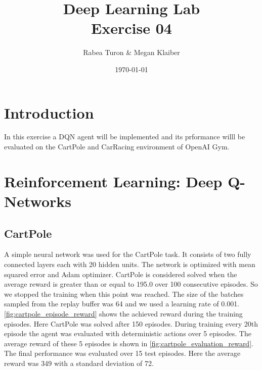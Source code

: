 \documentclass[a4paper,12pt]{article}
\begin{document}
\title{Deep Learning Lab \\ Exercise 04 }
\author{Rabea Turon \& Megan Klaiber}
\date{\today}
\maketitle

\section{Introduction}

In this exercise a DQN agent will be implemented and its prformance willl be evaluated on the CartPole and CarRacing environment of OpenAI Gym.


\section{Reinforcement Learning: Deep Q-Networks}\label{rl}


\subsection{CartPole}\label{cartpole}

A simple neural network was used for the CartPole task. It consists of two fully connected layers each with 20 hidden units. The network is optimized with mean squared error and Adam optimizer. CartPole is considered solved when the average reward is greater than or equal to 195.0 over 100 consecutive episodes. So we stopped the training when this point was reached. The size of the batches sampled from the replay buffer was 64 and we used a learning rate of 0.001.\\

\autoref{fig:cartpole_episode_reward} shows the achieved reward during the training episodes. Here CartPole was solved after 150 episodes. During training every 20th episode the agent was evaluated with deterministic actions over 5 episodes. The average reward of these 5 episodes is shown in \autoref{fig:cartpole_evaluation_reward}. The final performance was evaluated over 15 test episodes. Here the average reward was 349 with a standard deviation of 72.
\end{document}
